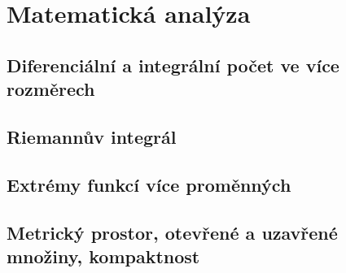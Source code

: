 \documentclass[../../main.tex]{subfiles}
\begin{document}
\section{Matematická analýza}

\subsection{Diferenciální a integrální počet ve více rozměrech}
\subsection{Riemannův integrál}
\subsection{Extrémy funkcí více proměnných}
\subsection{Metrický prostor, otevřené a uzavřené množiny, kompaktnost}
\end{document}
